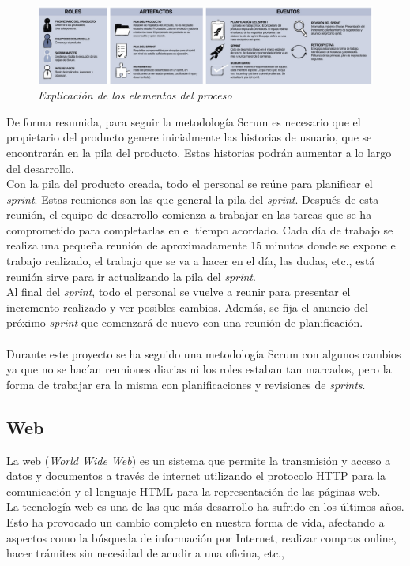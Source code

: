 \begin{figure}[h]
	\centering
	\includegraphics[width=\textwidth]{../img/Scrum/Scrum1.png}
	\caption{\textit{Explicación de los elementos del proceso \cite{scrum}}}
\end{figure}
\FloatBarrier

De forma resumida, para seguir la metodología Scrum es necesario que el propietario del producto genere inicialmente las historias de usuario, que se encontrarán en la pila del producto. Estas historias podrán aumentar a lo largo del desarrollo.\\
Con la pila del producto creada, todo el personal se reúne para planificar el \textit{sprint}. Estas reuniones son las que general la pila del \textit{sprint}.
Después de esta reunión, el equipo de desarrollo comienza a trabajar en las tareas que se ha comprometido para completarlas en el tiempo acordado. Cada día de trabajo se realiza una pequeña reunión de aproximadamente 15 minutos donde se expone el trabajo realizado, el trabajo que se va a hacer en el día, las dudas, etc., está reunión sirve para ir actualizando la pila del \textit{sprint}. \\
Al final del \textit{sprint}, todo el personal se vuelve a reunir para presentar el incremento realizado y ver posibles cambios. Además, se fija el anuncio del próximo \textit{sprint} que comenzará de nuevo con una reunión de planificación. \\\\
Durante este proyecto se ha seguido una metodología Scrum con algunos cambios ya que no se hacían reuniones diarias ni los roles estaban tan marcados, pero la forma de trabajar era la misma con planificaciones y revisiones de \textit{sprints}.

\subsection{Web}
La web (\textit{World Wide Web}) es un sistema que permite la transmisión y acceso a datos y documentos a través de internet utilizando el protocolo HTTP para la comunicación y el lenguaje HTML para la representación de las páginas web. \cite{wiki:web}\\
La tecnología web es una de las que más desarrollo ha sufrido en los últimos años. Esto ha provocado un cambio completo en nuestra forma de vida, afectando a aspectos como la búsqueda de información por Internet, realizar compras online, hacer trámites sin necesidad de acudir a una oficina, etc.,\\ 
 
